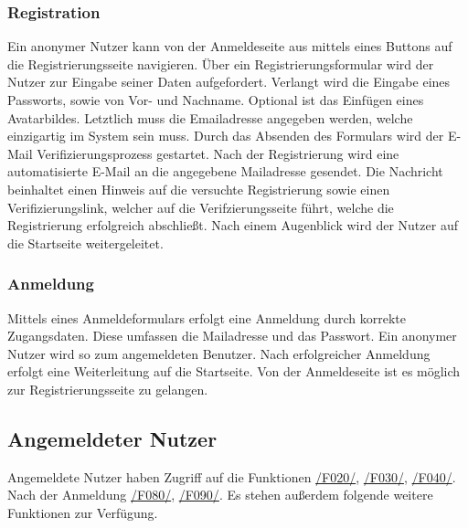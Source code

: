 \subsubsection{Registration}
\begin{description}
     Ein anonymer Nutzer kann von der Anmeldeseite aus mittels eines
    Buttons auf die Registrierungsseite navigieren.
     Über ein Registrierungsformular wird der Nutzer zur Eingabe seiner
    Daten aufgefordert. Verlangt wird die Eingabe eines Passworts, %
    sowie von Vor- und Nachname. Optional ist das Einfügen eines Avatarbildes. Letztlich muss die Emailadresse
    angegeben werden, welche einzigartig im System sein muss. Durch das Absenden des Formulars wird der E-Mail Verifizierungsprozess
    gestartet.
     Nach der Registrierung wird eine automatisierte E-Mail
    an die angegebene Mailadresse gesendet. Die Nachricht beinhaltet einen Hinweis auf
    die versuchte Registrierung sowie einen Verifizierungslink, welcher auf die Verifzierungsseite führt, welche
    die Registrierung erfolgreich abschließt. Nach einem Augenblick wird der Nutzer
    auf die Startseite weitergeleitet.
\end{description}

\subsubsection{Anmeldung}
\begin{description}
     Mittels eines Anmeldeformulars erfolgt eine Anmeldung durch korrekte Zugangsdaten.
    Diese umfassen die Mailadresse und das Passwort.
    Ein anonymer Nutzer wird so zum angemeldeten Benutzer.
    Nach erfolgreicher Anmeldung erfolgt eine Weiterleitung auf die Startseite.
     Von der Anmeldeseite ist es möglich zur Registrierungsseite zu gelangen.
\end{description}

\subsection{Angemeldeter Nutzer}
Angemeldete Nutzer haben Zugriff auf die Funktionen
\hyperref[funkt:020]{/F020/}, \hyperref[funkt:030]{/F030/}, \hyperref[funkt:040]{/F040/}.
Nach der Anmeldung \hyperref[funkt:080]{/F080/}, \hyperref[funkt:090]{/F090/}.
Es stehen außerdem folgende weitere Funktionen zur Verfügung.

